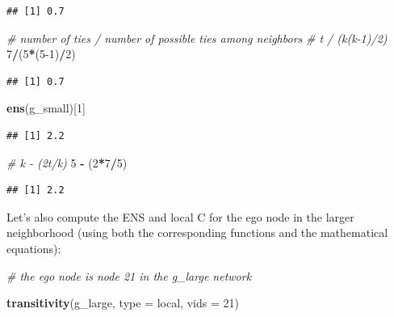 \documentclass[
]{book}
\newenvironment{Shaded}{\begin{snugshade}}{\end{snugshade}}
\newcommand{\AttributeTok}[1]{\textcolor[rgb]{0.13,0.29,0.53}{#1}}
\newcommand{\CommentTok}[1]{\textcolor[rgb]{0.56,0.35,0.01}{\textit{#1}}}
\newcommand{\DecValTok}[1]{\textcolor[rgb]{0.00,0.00,0.81}{#1}}
\newcommand{\FunctionTok}[1]{\textcolor[rgb]{0.13,0.29,0.53}{\textbf{#1}}}
\newcommand{\NormalTok}[1]{#1}
\newcommand{\SpecialCharTok}[1]{\textcolor[rgb]{0.81,0.36,0.00}{\textbf{#1}}}
\newcommand{\StringTok}[1]{\textcolor[rgb]{0.31,0.60,0.02}{#1}}
\begin{document}
\begin{verbatim}
## [1] 0.7
\end{verbatim}

\begin{Shaded}
\begin{Highlighting}[]
\CommentTok{\# number of ties / number of possible ties among neighbors }
\CommentTok{\# t / (k(k{-}1)/2)}
\DecValTok{7}\SpecialCharTok{/}\NormalTok{(}\DecValTok{5}\SpecialCharTok{*}\NormalTok{(}\DecValTok{5{-}1}\NormalTok{)}\SpecialCharTok{/}\DecValTok{2}\NormalTok{) }
\end{Highlighting}
\end{Shaded}

\begin{verbatim}
## [1] 0.7
\end{verbatim}

\begin{Shaded}
\begin{Highlighting}[]
\FunctionTok{ens}\NormalTok{(g\_small)[}\DecValTok{1}\NormalTok{]}
\end{Highlighting}
\end{Shaded}

\begin{verbatim}
## [1] 2.2
\end{verbatim}

\begin{Shaded}
\begin{Highlighting}[]
\CommentTok{\# k {-} (2t/k)}
\DecValTok{5} \SpecialCharTok{{-}}\NormalTok{ (}\DecValTok{2}\SpecialCharTok{*}\DecValTok{7}\SpecialCharTok{/}\DecValTok{5}\NormalTok{)}
\end{Highlighting}
\end{Shaded}

\begin{verbatim}
## [1] 2.2
\end{verbatim}

Let's also compute the ENS and local C for the ego node in the larger neighborhood (using both the corresponding functions and the mathematical equations):

\begin{Shaded}
\begin{Highlighting}[]
\CommentTok{\# the ego node is node 21 in the g\_large network }

\FunctionTok{transitivity}\NormalTok{(g\_large, }\AttributeTok{type =} \StringTok{\textquotesingle{}local\textquotesingle{}}\NormalTok{, }\AttributeTok{vids =} \DecValTok{21}\NormalTok{)}
\end{Highlighting}
\end{Shaded}
\end{document}

